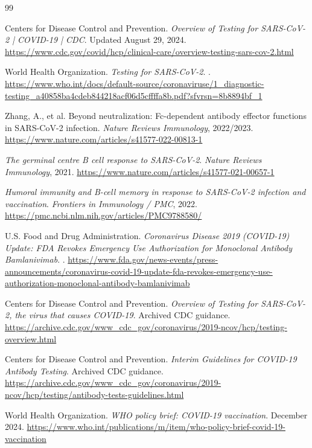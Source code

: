 \documentclass[12pt]{article}
\begin{document}
\begin{thebibliography}{99}

Centers for Disease Control and Prevention.
\newblock \emph{Overview of Testing for SARS-CoV-2 | COVID-19 | CDC}.
\newblock Updated August 29, 2024.
\newblock \url{https://www.cdc.gov/covid/hcp/clinical-care/overview-testing-sars-cov-2.html}

World Health Organization.
\newblock \emph{Testing for SARS-CoV-2}.
.
\newblock \url{https://www.who.int/docs/default-source/coronaviruse/1_diagnostic-testing_a40858ba4cdeb844218acf06d5cffffa8b.pdf?sfvrsn=8b8894bf_1}

Zhang, A., et al.
\newblock Beyond neutralization: Fc-dependent antibody effector functions in SARS-CoV-2 infection.
\newblock \emph{Nature Reviews Immunology}, 2022/2023.
\newblock \url{https://www.nature.com/articles/s41577-022-00813-1}

\emph{The germinal centre B cell response to SARS-CoV-2}.
\newblock \emph{Nature Reviews Immunology}, 2021.
\newblock \url{https://www.nature.com/articles/s41577-021-00657-1}

\emph{Humoral immunity and B-cell memory in response to SARS-CoV-2 infection and vaccination}.
\newblock \emph{Frontiers in Immunology / PMC}, 2022.
\newblock \url{https://pmc.ncbi.nlm.nih.gov/articles/PMC9788580/}

U.S. Food and Drug Administration.
\newblock \emph{Coronavirus Disease 2019 (COVID-19) Update: FDA Revokes Emergency Use Authorization for Monoclonal Antibody Bamlanivimab}.
.
\newblock \url{https://www.fda.gov/news-events/press-announcements/coronavirus-covid-19-update-fda-revokes-emergency-use-authorization-monoclonal-antibody-bamlanivimab}

Centers for Disease Control and Prevention.
\newblock \emph{Overview of Testing for SARS-CoV-2, the virus that causes COVID-19}.
\newblock Archived CDC guidance.
\newblock \url{https://archive.cdc.gov/www_cdc_gov/coronavirus/2019-ncov/hcp/testing-overview.html}

Centers for Disease Control and Prevention.
\newblock \emph{Interim Guidelines for COVID-19 Antibody Testing}.
\newblock Archived CDC guidance.
\newblock \url{https://archive.cdc.gov/www_cdc_gov/coronavirus/2019-ncov/hcp/testing/antibody-tests-guidelines.html}

World Health Organization.
\newblock \emph{WHO policy brief: COVID-19 vaccination}.
\newblock December 2024.
\newblock \url{https://www.who.int/publications/m/item/who-policy-brief-covid-19-vaccination}


\end{thebibliography}
\end{document}
